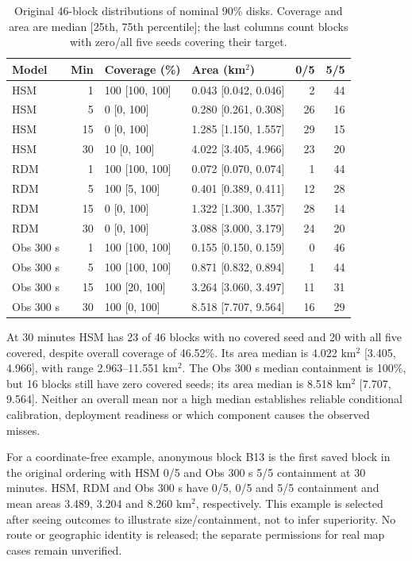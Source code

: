 \begin{table}[htbp]
\centering\small
\caption{Original 46-block distributions of nominal 90\% disks.
Coverage and area are median [25th, 75th percentile]; the last columns
count blocks with zero/all five seeds covering their target.}
\label{tab:block-calibration}\hypertarget{tab:block-calibration}{}
\begin{tabular}{@{}lrl lrr@{}}
\toprule
Model & Min & Coverage (\%) & Area (km$^2$) & 0/5 & 5/5\\
\midrule
HSM & 1 & 100 [100, 100] & 0.043 [0.042, 0.046] & 2 & 44\\
HSM & 5 & 0 [0, 100] & 0.280 [0.261, 0.308] & 26 & 16\\
HSM & 15 & 0 [0, 100] & 1.285 [1.150, 1.557] & 29 & 15\\
HSM & 30 & 10 [0, 100] & 4.022 [3.405, 4.966] & 23 & 20\\
\midrule
RDM & 1 & 100 [100, 100] & 0.072 [0.070, 0.074] & 1 & 44\\
RDM & 5 & 100 [5, 100] & 0.401 [0.389, 0.411] & 12 & 28\\
RDM & 15 & 0 [0, 100] & 1.322 [1.300, 1.357] & 28 & 14\\
RDM & 30 & 0 [0, 100] & 3.088 [3.000, 3.179] & 24 & 20\\
\midrule
Obs 300 s & 1 & 100 [100, 100] & 0.155 [0.150, 0.159] & 0 & 46\\
Obs 300 s & 5 & 100 [100, 100] & 0.871 [0.832, 0.894] & 1 & 44\\
Obs 300 s & 15 & 100 [20, 100] & 3.264 [3.060, 3.497] & 11 & 31\\
Obs 300 s & 30 & 100 [0, 100] & 8.518 [7.707, 9.564] & 16 & 29\\
\bottomrule
\end{tabular}
\end{table}

At 30 minutes HSM has 23 of 46 blocks with no covered seed and 20 with
all five covered, despite overall coverage of 46.52\%. Its area median is
4.022 km$^2$ [3.405, 4.966], with range 2.963--11.551 km$^2$.
The Obs 300 s median containment is 100\%, but 16 blocks still have zero
covered seeds; its area median is 8.518 km$^2$ [7.707, 9.564].
Neither an overall mean nor a high median establishes reliable
conditional calibration, deployment readiness or which component causes
the observed misses.

For a coordinate-free example, anonymous block B13 is the first saved
block in the original ordering with HSM 0/5 and Obs 300 s 5/5 containment
at 30 minutes. HSM, RDM and Obs 300 s have 0/5, 0/5 and 5/5 containment
and mean areas 3.489, 3.204 and 8.260 km$^2$, respectively. This example
is selected after seeing outcomes to illustrate size/containment, not
to infer superiority. No route or geographic identity is released;
the separate permissions for real map cases remain unverified.

